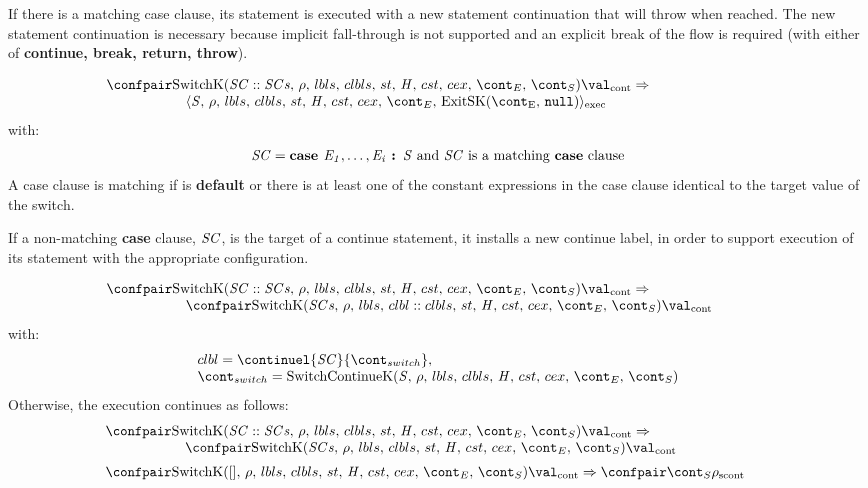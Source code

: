 \documentclass{article}
\begin{document}
If there is a matching case clause, its statement is executed with a new statement continuation that will throw when reached.
The new statement continuation is necessary because implicit fall-through is not supported and an explicit break of the flow is required (with either of \textbf{continue, break, return, throw}).

\[
  \begin{array}{lcl}
	\contconf{\SwitchK{\scase :: \scases}{\clbls}}{\val}
	\Rightarrow \hspace{30mm}\\
	\hspace{20mm}\execconf{\stmt}{\env}{\lbls}{\clbls}{\handler}{\cstrace}{\cex}{\econt}{\ExitSK{\tt{null}}}
  \end{array}
\]
with:
\[
	\mathit{SC} = \textbf{case } \mathit{E}_\mathit{1}, \dots, \mathit{E}_\mathit{i} \textbf{ : } \mathit{S} \textrm{ and } \mathit{SC} \textrm{ is a matching \textbf{case} clause}
\]
A case clause is matching if is \textbf{default} or there is at least one of the constant expressions in the case clause identical to the target value of the switch.

\noindent
If a non-matching \textbf{case} clause, $\mathit{SC}$, is the target of a continue statement, it installs a new continue label, in order to support execution of its statement with the appropriate configuration.

\[
  \begin{array}{lcl}
	\contconf{\SwitchK{\scase :: \scases}{\clbls}}{\val}
	\Rightarrow \hspace{30mm}\\
	\hspace{20mm}\contconf{\SwitchK{\scases}{\clbl :: \clbls}}{\val}
  \end{array}
\]
with:
\[
  \begin{array}{l}
	\clbl = \continuel{\scase}{\switchcont},\\
	\switchcont = \ContinueK
  \end{array}
\]
\noindent
Otherwise, the execution continues as follows:
\[
  \begin{array}{lcl}
    \contconf{\SwitchK{\scase :: \scases}{\clbls}}{\val}
	\Rightarrow \hspace{30mm}\\
	\hspace{20mm}\contconf{\SwitchK{\scases}{\clbls}}{\val}\\[2mm]

	\contconf{\SwitchK{[]}{\clbls}}{\val}
	\Rightarrow
	\scontconf{\scont}{\env}
  \end{array}
\]
\end{document}
